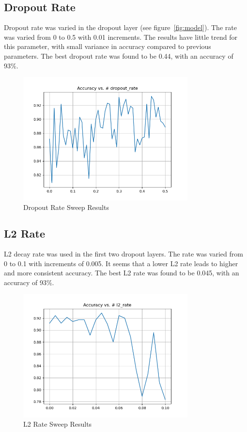 \documentclass{article}
\begin{document}
\subsection{Dropout Rate}

Dropout rate was varied in the dropout layer (see figure~\ref{fig:model}). The rate was varied from 0 to 0.5 with 0.01 increments. The results have little trend for this parameter, with small variance in accuracy compared to previous parameters. The best dropout rate was found to be 0.44, with an accuracy of 93\%.

\begin{figure}[H]
    \centering
    \includegraphics[width=0.8\textwidth]{../media/dropout_rate_sweep.png}
    \caption{Dropout Rate Sweep Results}
    \label{fig:dropout}
\end{figure}


\subsection{L2 Rate}

L2 decay rate was used in the first two dropout layers. The rate was varied from 0 to 0.1 with increments of 0.005. It seems that a lower L2 rate leads to higher and more consistent accuracy. The best L2 rate was found to be 0.045, with an accuracy of 93\%.

\begin{figure}[H]
    \centering
    \includegraphics[width=0.8\textwidth]{../media/l2_rate_sweep.png}
    \caption{L2 Rate Sweep Results}
    \label{fig:l2}
\end{figure}
\end{document}
